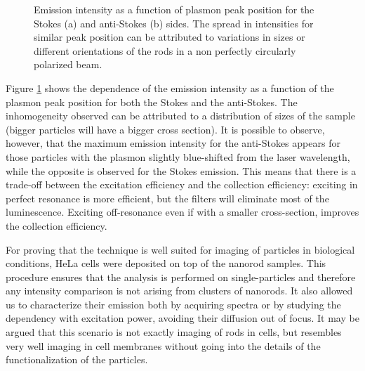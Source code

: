 \documentclass[journal=nalefd,manuscript=letter]{achemso}
\begin{document}
\begin{figure}[htp]
\centering
	\caption{Emission intensity as a function of plasmon peak position for the
	Stokes (a) and anti-Stokes (b) sides. The spread in intensities for similar
	peak position can be attributed to variations in sizes or different
	orientations of the rods in a non perfectly circularly polarized beam.}
	\label{fig:emission_peak_position}
\end{figure}

Figure \ref{fig:emission_peak_position} shows the dependence of the emission
intensity as a function of the plasmon peak position for both the Stokes and the
anti-Stokes. The inhomogeneity observed can be attributed to a distribution of
sizes of the sample (bigger particles will have a bigger cross section). It is
possible to observe, however, that the maximum emission intensity for the
anti-Stokes appears for those particles with the plasmon slightly blue-shifted
from the laser wavelength, while the opposite is observed for the Stokes
emission. This means that there is a trade-off between the excitation efficiency
and the collection efficiency: exciting in perfect resonance is more efficient,
but the filters will eliminate most of the luminescence. Exciting off-resonance
even if with a smaller cross-section, improves the collection efficiency.

For proving that the technique is well suited for imaging of particles in
biological conditions, HeLa cells were deposited on top of the nanorod samples.
This procedure ensures that the analysis is performed on single-particles and
therefore any intensity comparison is not arising from clusters of nanorods.
It also allowed us to characterize their emission both by acquiring spectra or
by studying the dependency with excitation power, avoiding their diffusion out
of focus. It may be argued that this scenario is not exactly imaging of rods in
cells, but resembles very well imaging in cell membranes without going into the
details of the functionalization of the particles.
\end{document}
